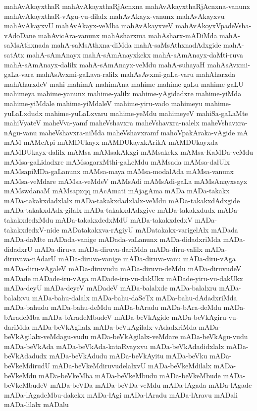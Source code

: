 {mahAvAkayxthaR
mahAvAkayxthaRjAcnxna
mahAvAkayxthaRjAcnxna-vanunx
mahAvAkayxthaR-vAgu-vu-dilalx
mahAvAkayx-vanunx
mahAvAkayxvu
mahAvAkayxvU
mahAvAkayx-veMba
mahAvAkayxveV
mahAvAkoyxVpadeVsha-vAdoDane
mahAvicAra-vanunx
mahAsharxma
mahAsharx-mADiMda
mahA-saMsAthxnada
mahA-saMsAthxna-diMda
mahA-saMsAthxnadAdxgide
mahA-satAtx
mahA-sAmAnayx
mahA-sAmAnayxkekx
mahA-sAmAnayx-daMti-ruva
mahA-sAmAnayx-dalilx
mahA-sAmAnayx-veMdu
mahA-suhayaH
mahAsAvxmi-gaLa-vara
mahAsAvxmi-gaLava-ralilx
mahAsAvxmi-gaLa-varu
mahAharxda
mahAharxdeV
mahi
mahimA
mahimAna
mahime
mahime-gaLu
mahime-gaLU
mahimeya
mahime-yanunx
mahime-yalilx
mahime-yAgidadxre
mahime-yiMda
mahime-yiMdale
mahime-yiMdaleV
mahime-yiru-vado
mahimeyu
mahime-yuLaLxdudx
mahime-yuLaLxvaru
mahime-yeMdu
mahimeyeV
mahiSa-gaLaMte
mahiVyateV
maheVva-yamf
maheVshavxra
maheVshavxra-nalelx
maheVshavxra-nAgu-vanu
maheVshavxra-niMda
maheVshavxramf
mahoVpakAraka-vAgide
mA
mAM
mAMcApi
mAMDUkayx
mAMDUkayxkArikA
mAMDUkayxda
mAMDUkayx-dalilx
mAMsa
mAMsakAkxgi
mAMsakekx
mAMsa-KaMDa-veMdu
mAMsa-gaLidadxre
mAMsagarxMthi-gaLeMdu
mAMsada
mAMsa-dalUlx
mAMsapiMDa-gaLanunx
mAMsa-maya
mAMsa-modalAda
mAMsa-vanunx
mAMsa-veMdare
mAMsa-veMdeV
mAMsAdi
mAMsAdi-gaLa
mAMsAnayxsayx
mAMswdanaM
mAMsapxqq
mAcAmati
mAjagAma
mADa
mADa-takakx
mADa-takakxdadxlalx
mADa-takakxdadxlalx-veMdu
mADa-takakxdAdxgide
mADa-takakxdAdx-gilalx
mADa-takakxdAdxgive
mADa-takakxdudx
mADa-takakxdedxMdu
mADa-takakxdedxMdU
mADa-takakxdedxV
mADa-takakxdedxV-nide
mADatakakxva-rAgiyU
mADatakakx-varigelAlx
mADada
mADa-daMte
mADada-vanige
mADada-vaLanunx
mADa-didadxriMda
mADa-didadxrU
mADa-diruva
mADa-diruva-dariMda
mADa-diru-valilx
mADa-diruvava-nAdarU
mADa-diruva-vanige
mADa-diruva-vanu
mADa-diru-vAga
mADa-diru-vAgaleV
mADa-diruvudu
mADa-diruvu-deMdu
mADa-diruvudeV
mADade
mADade-iru-vAga
mADade-iru-vu-dakUkx
mADade-yiru-vu-dakUkx
mADa-deyU
mADa-deyeV
mADadeV
mADa-balalxde
mADa-balalxru
mADa-balalxvu
mADa-bahu-dalalx
mADa-bahu-daSeTx
mADa-bahu-dAdadxriMda
mADa-bahudu
mADa-bahu-deMdu
mADa-bAradu
mADa-bAra-deMdu
mADa-bAradeMba
mADa-bAradeMbudeV
mADa-beVkAgide
mADa-beVkAgiru-vu-dariMda
mADa-beVkAgilalx
mADa-beVkAgilalx-vAdadxriMda
mADa-beVkAgilalx-veMdagu-vudu
mADa-beVkAgilalx-veMdare
mADa-beVkAgu-vudu
mADa-beVkAda
mADa-beVkAda-kataRvayxvu
mADa-beVkAdadidxlalx
mADa-beVkAdadudx
mADa-beVkAdudu
mADa-beVkAyitu
mADa-beVku
mADa-beVkeMdirudU
mADa-beVkeMdiruvudelalxvU
mADa-beVkeMdilalx
mADa-beVkeMdu
mADa-beVkeMba
mADa-beVkeMbudu
mADa-beVkeMbude
mADa-beVkeMbudeV
mADa-beVDa
mADa-beVDa-veMdu
mADa-lAgada
mADa-lAgade
mADa-lAgadeMbu-dakekx
mADa-lAgi
mADa-lAradu
mADa-lAravu
mADali
mADa-lilalx
mADalu
}

